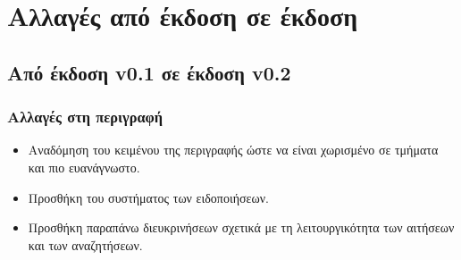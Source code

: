 \documentclass[12pt,a4paper]{article}
\begin{document}
\section{Αλλαγές από έκδοση σε έκδοση}

\subsection{Από έκδοση v0.1 σε έκδοση v0.2}
\subsubsection{Αλλαγές στη περιγραφή}
\begin{itemize}
    \item Αναδόμηση του κειμένου της περιγραφής ώστε να είναι χωρισμένο σε τμήματα και πιο ευανάγνωστο. 
    \item Προσθήκη του συστήματος των ειδοποιήσεων.
    \item Προσθήκη παραπάνω διευκρινήσεων σχετικά με τη λειτουργικότητα των αιτήσεων και των αναζητήσεων.
\end{itemize}
\end{document}
